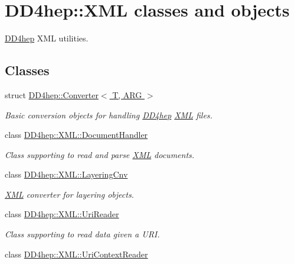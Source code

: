 \hypertarget{group___d_d4_h_e_p___x_m_l}{
\section{DD4hep::XML classes and objects}
\label{group___d_d4_h_e_p___x_m_l}
}


\hyperlink{namespace_d_d4hep}{DD4hep} XML utilities.  
\subsection*{Classes}
\begin{DoxyCompactItemize}
\item 
struct \hyperlink{struct_d_d4hep_1_1_converter}{DD4hep::Converter$<$ T, ARG $>$}
\begin{DoxyCompactList}\small\item\em Basic conversion objects for handling \hyperlink{namespace_d_d4hep}{DD4hep} \hyperlink{namespace_d_d4hep_1_1_x_m_l}{XML} files. \item\end{DoxyCompactList}\item 
class \hyperlink{class_d_d4hep_1_1_x_m_l_1_1_document_handler}{DD4hep::XML::DocumentHandler}
\begin{DoxyCompactList}\small\item\em Class supporting to read and parse \hyperlink{namespace_d_d4hep_1_1_x_m_l}{XML} documents. \item\end{DoxyCompactList}\item 
class \hyperlink{class_d_d4hep_1_1_x_m_l_1_1_layering_cnv}{DD4hep::XML::LayeringCnv}
\begin{DoxyCompactList}\small\item\em \hyperlink{namespace_d_d4hep_1_1_x_m_l}{XML} converter for layering objects. \item\end{DoxyCompactList}\item 
class \hyperlink{class_d_d4hep_1_1_x_m_l_1_1_uri_reader}{DD4hep::XML::UriReader}
\begin{DoxyCompactList}\small\item\em Class supporting to read data given a URI. \item\end{DoxyCompactList}\item 
class \hyperlink{class_d_d4hep_1_1_x_m_l_1_1_uri_context_reader}{DD4hep::XML::UriContextReader}

\end{DoxyCompactItemize}

